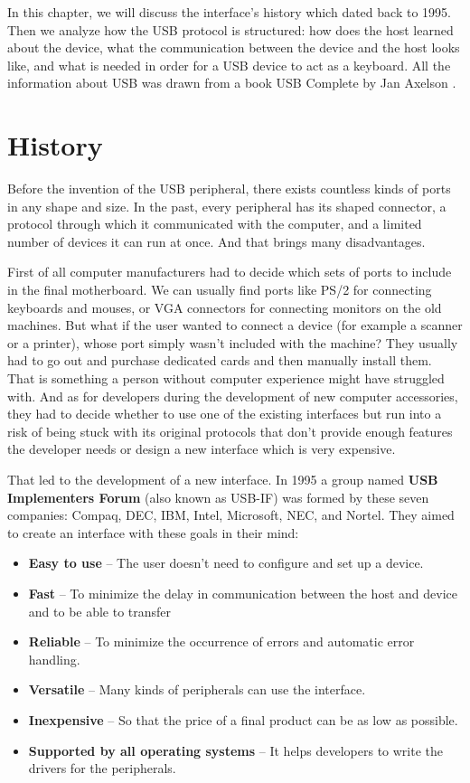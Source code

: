 In this chapter, we will discuss the interface's history which dated back to 1995. Then we analyze how the USB protocol is structured: how does the host learned about the device, what the communication between the device and the host looks like, and what is needed in order for a USB device to act as a keyboard. All the information about USB was drawn from a book USB Complete by Jan Axelson \cite{USBComplete}.

\section{History}
\label{sec:history}
Before the invention of the USB peripheral, there exists countless kinds of ports in any shape and size. In the past, every peripheral has its shaped connector, a protocol through which it communicated with the computer, and a limited number of devices it can run at once. And that brings many disadvantages.

First of all computer manufacturers had to decide which sets of ports to include in the final motherboard. We can usually find ports like PS/2 for connecting keyboards and mouses, or VGA connectors for connecting monitors on the old machines. But what if the user wanted to connect a device (for example a scanner or a printer), whose port simply wasn't included with the machine? They usually had to go out and purchase dedicated cards and then manually install them. That is something a person without computer experience might have struggled with. And as for developers during the development of new computer accessories, they had to decide whether to use one of the existing interfaces but run into a risk of being stuck with its original protocols that don't provide enough features the developer needs or design a new interface which is very expensive.

That led to the development of a new interface. In 1995 a group named \textbf{USB Implementers Forum} (also known as USB-IF) was formed by these seven companies: Compaq, DEC, IBM, Intel, Microsoft, NEC, and Nortel. They aimed to create an interface with these goals in their mind:
\begin{itemize}
    \item \textbf{Easy to use} \--- The user doesn't need to configure and set up a device.
    \item \textbf{Fast} \--- To minimize the delay in communication between the host and device and to be able to transfer
    \item \textbf{Reliable} \--- To minimize the occurrence of errors and automatic error handling.
    \item \textbf{Versatile} \--- Many kinds of peripherals can use the interface.
    \item \textbf{Inexpensive} \--- So that the price of a final product can be as low as possible.
    \item \textbf{Supported by all operating systems} \--- It helps developers to write the drivers for the peripherals.
\end{itemize}

